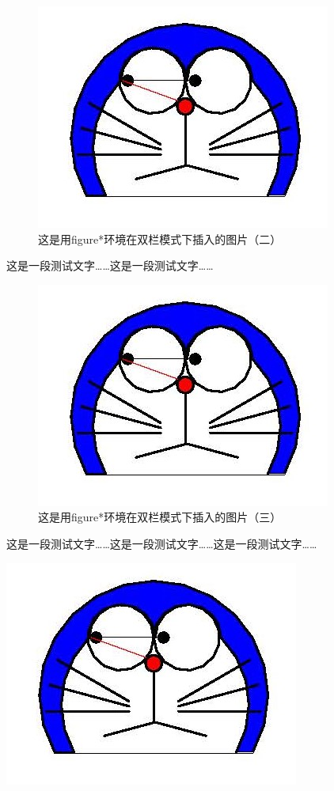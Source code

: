 ﻿\documentclass{article}
\begin{document}
    \begin{figure}[htbp]
        \includegraphics[width = .1\textwidth]{doraemon1.jpg}
        \caption{这是用figure*环境在双栏模式下插入的图片（二）}
    \end{figure}
    这是一段测试文字……这是一段测试文字……
    \begin{figure}[htbp]
        \includegraphics[width = .1\textwidth]{doraemon1.jpg}
        \caption{这是用figure*环境在双栏模式下插入的图片（三）}
    \end{figure}
    这是一段测试文字……这是一段测试文字……这是一段测试文字……

    \blindtext[7]

    
\twocolumn
    \begin{strip}
        \centering
        \includegraphics[width = .1\textwidth]{doraemon1.jpg}
    \end{strip}
\end{document}
